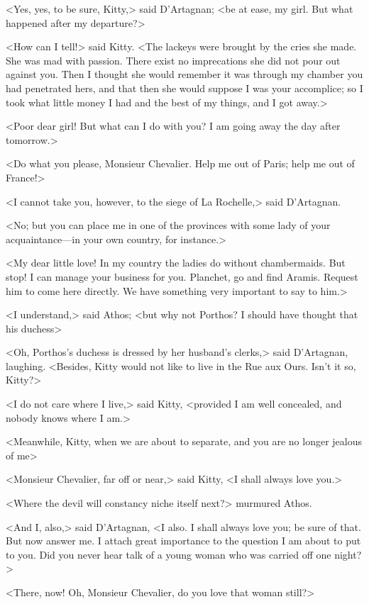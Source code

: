 <Yes, yes, to be sure, Kitty,> said D'Artagnan; <be at ease, my girl. But what happened after my departure?> 

<How can I tell!> said Kitty. <The lackeys were brought by the cries she made. She was mad with passion. There exist no imprecations she did not pour out against you. Then I thought she would remember it was through my chamber you had penetrated hers, and that then she would suppose I was your accomplice; so I took what little money I had and the best of my things, and I got away.>

<Poor dear girl! But what can I do with you? I am going away the day after tomorrow.> 

<Do what you please, Monsieur Chevalier. Help me out of Paris; help me out of France!> 

<I cannot take you, however, to the siege of La Rochelle,> said D'Artagnan. 

<No; but you can place me in one of the provinces with some lady of your acquaintance—in your own country, for instance.> 

<My dear little love! In my country the ladies do without chambermaids. But stop! I can manage your business for you. Planchet, go and find Aramis. Request him to come here directly. We have something very important to say to him.> 

<I understand,> said Athos; <but why not Porthos? I should have thought that his duchess\longdash> 

<Oh, Porthos's duchess is dressed by her husband's clerks,> said D'Artagnan, laughing. <Besides, Kitty would not like to live in the Rue aux Ours. Isn't it so, Kitty?> 

<I do not care where I live,> said Kitty, <provided I am well concealed, and nobody knows where I am.> 

<Meanwhile, Kitty, when we are about to separate, and you are no longer jealous of me\longdash> 

<Monsieur Chevalier, far off or near,> said Kitty, <I shall always love you.> 

<Where the devil will constancy niche itself next?> murmured Athos. 

<And I, also,> said D'Artagnan, <I also. I shall always love you; be sure of that. But now answer me. I attach great importance to the question I am about to put to you. Did you never hear talk of a young woman who was carried off one night?> 

<There, now! Oh, Monsieur Chevalier, do you love that woman still?> 

